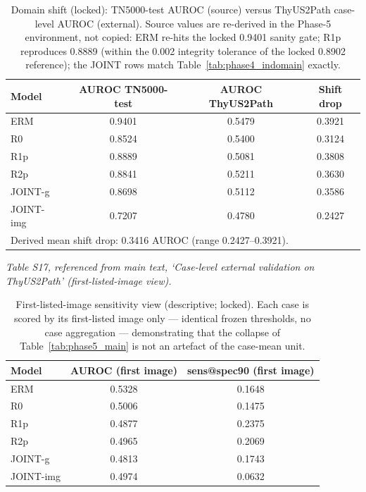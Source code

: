 \documentclass[11pt]{article}
\begin{document}
\begin{table}[!ht]
\centering\small
\caption{Domain shift (locked): TN5000-test AUROC (source) versus
ThyUS2Path case-level AUROC (external). Source values are re-derived in
the Phase-5 environment, not copied: ERM re-hits the locked 0.9401 sanity
gate; R1p reproduces 0.8889 (within the 0.002 integrity tolerance of the
locked 0.8902 reference); the JOINT rows match
Table~\ref{tab:phase4_indomain} exactly.}
\label{tab:phase5_shift}
\begin{tabular}{lccc}
\toprule
Model & AUROC TN5000-test & AUROC ThyUS2Path & Shift drop \\
\midrule
ERM       & 0.9401 & 0.5479 & 0.3921 \\
R0        & 0.8524 & 0.5400 & 0.3124 \\
R1p       & 0.8889 & 0.5081 & 0.3808 \\
R2p       & 0.8841 & 0.5211 & 0.3630 \\
JOINT-g   & 0.8698 & 0.5112 & 0.3586 \\
JOINT-img & 0.7207 & 0.4780 & 0.2427 \\
\midrule
\multicolumn{4}{l}{Derived mean shift drop: 0.3416 AUROC (range 0.2427--0.3921).}\\
\bottomrule
\end{tabular}
\end{table}

\noindent\emph{Table S17, referenced from main text, `Case-level external validation on ThyUS2Path' (first-listed-image view).}

\begin{table}[!ht]
\centering\small
\caption{First-listed-image sensitivity view (descriptive; locked). Each
case is scored by its first-listed image only --- identical frozen
thresholds, no case aggregation --- demonstrating that the collapse of
Table~\ref{tab:phase5_main} is not an artefact of the case-mean unit.}
\label{tab:phase5_firstimage}
\begin{tabular}{lcc}
\toprule
Model & AUROC (first image) & sens@spec90 (first image) \\
\midrule
ERM       & 0.5328 & 0.1648 \\
R0        & 0.5006 & 0.1475 \\
R1p       & 0.4877 & 0.2375 \\
R2p       & 0.4965 & 0.2069 \\
JOINT-g   & 0.4813 & 0.1743 \\
JOINT-img & 0.4974 & 0.0632 \\
\bottomrule
\end{tabular}
\end{table}
\end{document}
